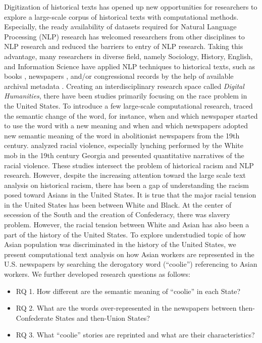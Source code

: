 \documentclass[11pt]{article}
\begin{document}
Digitization of historical texts has opened up new opportunities for 
researchers to explore a large-scale corpus of historical texts
with computational methods. Especially, the ready availability
of datasets required for Natural Language Processing (NLP) research 
has welcomed researchers from other disciplines to NLP research \cite{park2022raison} 
and reduced the barriers to entry of NLP research.
Taking this advantage, many researchers in diverse field,
namely Sociology, History, English, and Information Science 
have applied NLP techniques to historical texts, such as books \cite{parulian2022uncovering}, 
newspapers \cite{smith2013infectious,pedrazzini2022machines,santin2016or},
and/or congressional records \cite{lin2022enhancing, guldi2019parliament}
by the help of available archival metadata \cite{dobreski2019remodeling}.
Creating an interdisciplinary research space called \textit{Digital Humanities}, 
there have been studies primarily focusing on the race problem in the United States.
To introduce a few large-scale computational research, 
\citet{soni2021abolitionist} traced the semantic change of the word, for instance,
when and which newspaper started to use the word with a new meaning and when and which
newspapers adopted new semantic meaning of the word in abolitionist newspapers from the 19th century. 
\citet{franzosi2012ways} analyzed racial violence, especially lynching performed by the White mob
in the 19th century Georgia and presented quantitative narratives of the racial violence.
These studies intersect the problem of historical racism and NLP research.
However, despite the increasing attention toward the large scale text analysis on 
historical racism, there has been a gap of understanding the racism posed toward Asians in the United States.
It is true that the major racial tension in the United States has been between White and Black.
At the center of secession of the South and the creation of Confederacy, there was slavery problem. 
However, the racial tension between White and Asian has also been a part of the history of the United States.
To explore understudied topic of how Asian population was discriminated
in the history of the United States, we present computational text analysis on how Asian workers are represented in
the U.S. newspapers by searching the derogatory word (``coolie'') referencing to Asian workers. 
We further developed research questions as follows:

\begin{itemize}
  \item RQ 1. How different are the semantic meaning of ``coolie'' in each State? 
  \item RQ 2. What are the words over-represented in the newspapers between then-Confederate States and then-Union States?
  \item RQ 3. What ``coolie'' stories are reprinted and what are their characteristics?
\end{itemize}
\end{document}
